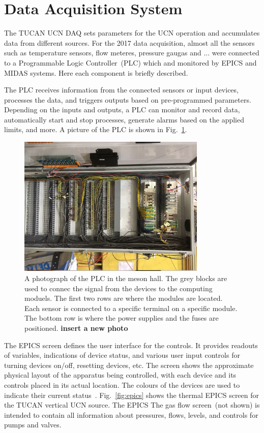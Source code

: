 \section{Data Acquisition System\label{sec:DAQ}}
The TUCAN UCN DAQ sets parameters for the UCN operation and
accumulates data from different sources. For the 2017 data
acquisition, almost all the sensors such as temperature sensors, flow
meteres, pressure gaugas and ... were connected to a Programmable
Logic Controller~(PLC) which and monitored by EPICS and MIDAS
systems. Here each component is briefly described.

The PLC receives information from the connected sensors or input
devices, processes the data, and triggers outputs based on
pre-programmed parameters.  Depending on the inputs and outputs, a PLC
can monitor and record data, automatically start and stop processes,
generate alarms based on the applied limits, and more. A picture of
the PLC is shown in Fig.~\ref{fig:PLC}.

\begin{figure}[h!]
  \centering
  \includegraphics[width=0.8\textwidth, angle = 90]{PLC.JPG}
  \caption{A photograph of the PLC in the meson hall. The grey blocks
    are used to connec the signal from the devices to the computing
    moduels. The first two rows are where the modules are
    located. Each sensor is connected to a specific terminal on a
    specific module. The bottom row is where the power supplies and the
    fuses are positioned. {\bf{insert a new photo}} }
  \label{fig:PLC}
\end{figure}

The EPICS screen defines the user interface for the controls. It
provides readouts of variables, indications of device status, and
various user input controls for turning devices on/off, resetting
devices, etc. The screen shows the approximate physical layout of the
apparatus being controlled, with each device and its controls placed
in its actual location. The colours of the devices are used to
indicate their current status~\cite{Sean_manual}. Fig.~\ref{fig:epics}
shows the thermal EPICS screen for the TUCAN vertical UCN source. The
EPICS The gas flow screen~(not shown) is intended to contain all
information about pressures, flows, levels, and controls for pumps and
valves.

